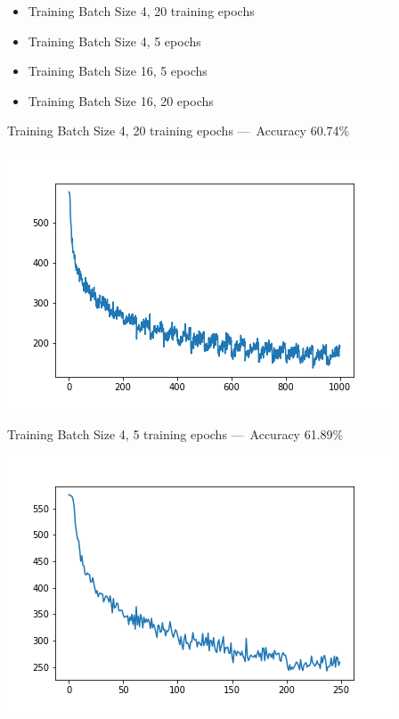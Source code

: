 \documentclass[answers]{exam}
\begin{document}
\begin{itemize}
    \item Training Batch Size 4, 20 training epochs
    \item Training Batch Size 4, 5 epochs
    \item Training Batch Size 16, 5 epochs
    \item Training Batch Size 16, 20 epochs 
\end{itemize}
\begin{solution}

Training Batch Size 4, 20 training epochs — Accuracy 60.74\%
\begin{center}
\includegraphics[scale=0.75]{Images/loss-4-20.png}
\end{center}


Training Batch Size 4, 5 training epochs — Accuracy 61.89\%
\begin{center}
\includegraphics[scale=0.75]{Images/loss-4-5.png}
\end{center}



\end{solution}
\end{document}
